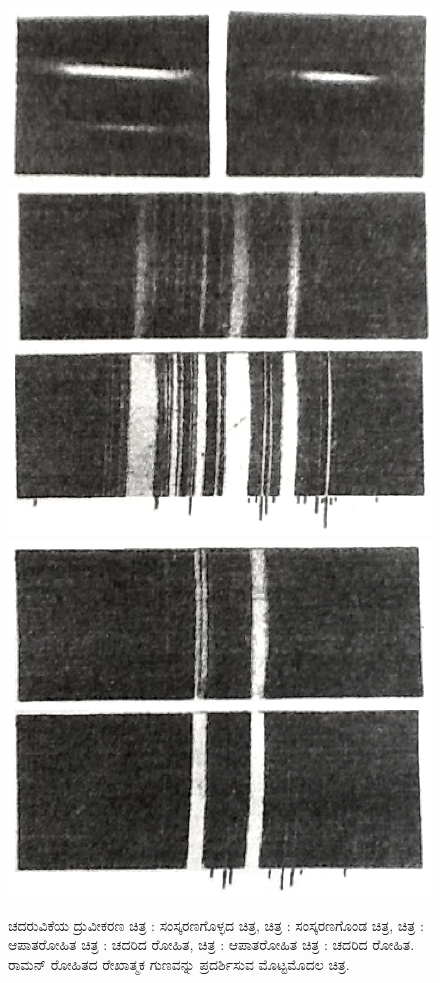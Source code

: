 \begin{figure}
\includegraphics{"images/12a.jpg"}\includegraphics{"images/12b.jpg"}\includegraphics{"images/12c.jpg"}
\caption{ಚದರುವಿಕೆಯ ದ್ರುವೀಕರಣ ಚಿತ್ರ \textbf{}: ಸಂಸ್ಕರಣಗೊಳ್ಳದ ಚಿತ್ರ, ಚಿತ್ರ \textbf{}: ಸಂಸ್ಕರಣಗೊಂಡ ಚಿತ್ರ, ಚಿತ್ರ \textbf{}: ಆಪಾತರೋಹಿತ ಚಿತ್ರ \textbf{}: ಚದರಿದ ರೋಹಿತ, ಚಿತ್ರ \textbf{}: ಆಪಾತರೋಹಿತ ಚಿತ್ರ \textbf{}: ಚದರಿದ ರೋಹಿತ. ರಾಮನ್ ರೋಹಿತದ ರೇಖಾತ್ಮಕ ಗುಣವನ್ನು ಪ್ರದರ್ಶಿಸುವ ಮೊಟ್ಟಮೊದಲ ಚಿತ್ರ.}
\end{figure}


